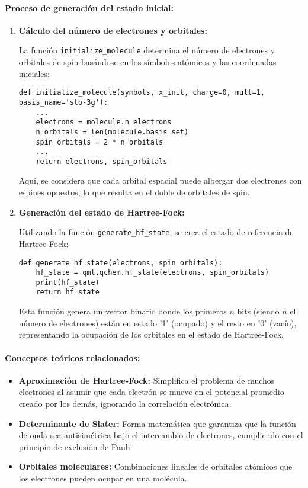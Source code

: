\paragraph{Proceso de generación del estado inicial:}

\begin{enumerate}
    \item \textbf{Cálculo del número de electrones y orbitales:}
    
    La función \texttt{initialize\_molecule} determina el número de electrones y orbitales de spin basándose en los símbolos atómicos y las coordenadas iniciales:
    
    \begin{verbatim}
def initialize_molecule(symbols, x_init, charge=0, mult=1, basis_name='sto-3g'):
    ...
    electrons = molecule.n_electrons
    n_orbitals = len(molecule.basis_set)
    spin_orbitals = 2 * n_orbitals
    ...
    return electrons, spin_orbitals
    \end{verbatim}
    
    Aquí, se considera que cada orbital espacial puede albergar dos electrones con espines opuestos, lo que resulta en el doble de orbitales de spin.
    
    \item \textbf{Generación del estado de Hartree-Fock:}
    
    Utilizando la función \texttt{generate\_hf\_state}, se crea el estado de referencia de Hartree-Fock:
    
    \begin{verbatim}
def generate_hf_state(electrons, spin_orbitals):
    hf_state = qml.qchem.hf_state(electrons, spin_orbitals)
    print(hf_state)
    return hf_state
    \end{verbatim}
    
    Esta función genera un vector binario donde los primeros \( n \) bits (siendo \( n \) el número de electrones) están en estado '1' (ocupado) y el resto en '0' (vacío), representando la ocupación de los orbitales en el estado de Hartree-Fock.
\end{enumerate}

\paragraph{Conceptos teóricos relacionados:}

\begin{itemize}
    \item \textbf{Aproximación de Hartree-Fock:} Simplifica el problema de muchos electrones al asumir que cada electrón se mueve en el potencial promedio creado por los demás, ignorando la correlación electrónica.
    \item \textbf{Determinante de Slater:} Forma matemática que garantiza que la función de onda sea antisimétrica bajo el intercambio de electrones, cumpliendo con el principio de exclusión de Pauli.
    \item \textbf{Orbitales moleculares:} Combinaciones lineales de orbitales atómicos que los electrones pueden ocupar en una molécula.
\end{itemize}

